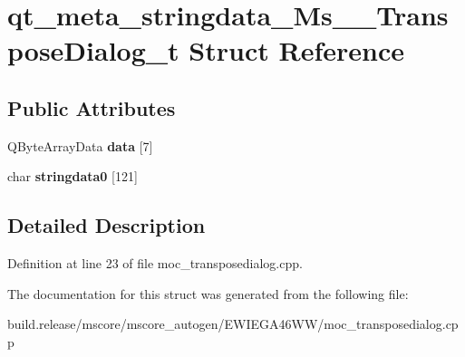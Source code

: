 \hypertarget{structqt__meta__stringdata___ms_____transpose_dialog__t}{}\section{qt\+\_\+meta\+\_\+stringdata\+\_\+\+Ms\+\_\+\+\_\+\+Transpose\+Dialog\+\_\+t Struct Reference}
\label{structqt__meta__stringdata___ms_____transpose_dialog__t}
\subsection*{Public Attributes}
\begin{DoxyCompactItemize}
\item 
\mbox{\label{structqt__meta__stringdata___ms_____transpose_dialog__t_a7cc0a414006918d7fc590e72b45b3e13}} 
Q\+Byte\+Array\+Data {\bfseries data} \mbox{[}7\mbox{]}
\item 
\mbox{\label{structqt__meta__stringdata___ms_____transpose_dialog__t_a5d2652b3733f418511ad6e3c1309b832}} 
char {\bfseries stringdata0} \mbox{[}121\mbox{]}
\end{DoxyCompactItemize}


\subsection{Detailed Description}


Definition at line 23 of file moc\+\_\+transposedialog.\+cpp.



The documentation for this struct was generated from the following file\+:\begin{DoxyCompactItemize}
\item 
build.\+release/mscore/mscore\+\_\+autogen/\+E\+W\+I\+E\+G\+A46\+W\+W/moc\+\_\+transposedialog.\+cpp\end{DoxyCompactItemize}
